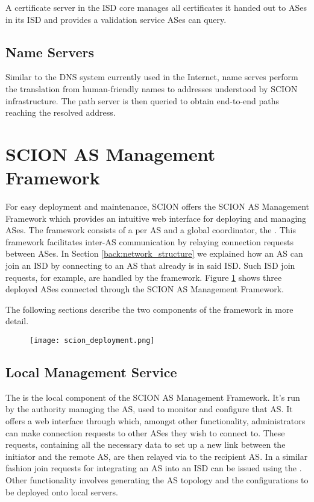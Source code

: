 A certificate server in the ISD core manages all certificates it handed out to ASes in its ISD and provides a validation service ASes can query.

\subsection{Name Servers}
Similar to the DNS system currently used in the Internet, name serves perform the translation from human-friendly names to addresses understood by SCION infrastructure. The path server is then queried to obtain end-to-end paths reaching the resolved address. \cite[Chapter~2]{scion_book} 


\section{SCION AS Management Framework}
\label{back:lmi}

For easy deployment and maintenance, SCION offers the SCION AS Management Framework which provides an intuitive web interface for deploying and managing ASes. The framework consists of a \lmi per AS and a global coordinator, the \lcs. This framework facilitates inter-AS communication by relaying connection requests between ASes. In Section \ref{back:network_structure} we explained how an AS can join an ISD by connecting to an AS that already is in said ISD. Such ISD join requests, for example, are handled by the framework. Figure \ref{back:deployment} shows three deployed ASes connected through the SCION AS Management Framework.

The following sections describe the two components of the framework in more detail.

\begin{figure}
	\centering
	\centerline{\texttt{[image: scion\_deployment.png]}}
	\label{back:deployment}
\end{figure}

\subsection{Local Management Service}

The  is the local component of the SCION AS Management Framework. It's run by the authority managing the AS, used to monitor and configure that AS. It offers a web interface through which, amongst other functionality, administrators can make connection requests to other ASes they wish to connect to. These requests, containing all the necessary data to set up a new link between the initiator and the remote AS, are then relayed via \lcs to the recipient AS. \cite[Chapter~10]{scion_book} In a similar fashion join requests for integrating an AS into an ISD can be issued using the \lmi. Other functionality involves generating the AS topology and the configurations to be deployed onto local servers.

